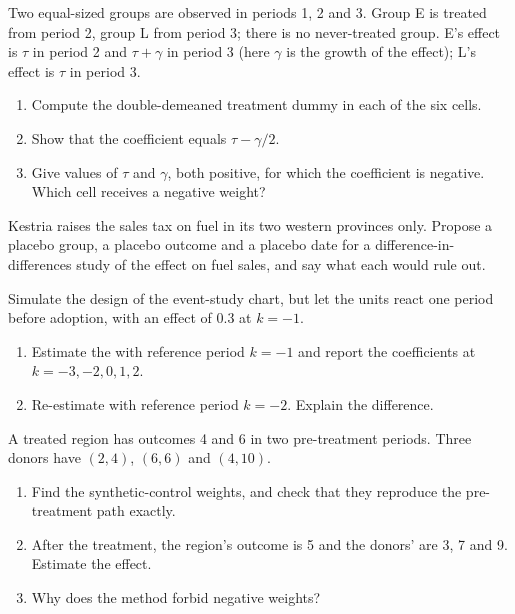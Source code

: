 \begin{exercise}[$\star\star$]\label{exo:b3:difference-in-differences:8}
Two equal-sized groups are observed in periods 1, 2 and 3. Group E is treated
from period 2, group L from period 3; there is no never-treated group. E's
effect is $\tau$ in period 2 and $\tau + \gamma$ in period 3 (here $\gamma$ is
the growth of the effect); L's effect is $\tau$ in period 3.
\begin{enumerate}
\item Compute the double-demeaned treatment dummy in each of the six cells.
\item Show that the  coefficient equals $\tau - \gamma/2$.
\item Give values of $\tau$ and $\gamma$, both positive, for which the
coefficient is negative. Which cell receives a negative weight?
\end{enumerate}
\end{exercise}

\begin{exercise}[$\star\star$]\label{exo:b3:difference-in-differences:9}
Kestria raises the sales tax on fuel in its two western provinces only. Propose
a placebo group, a placebo outcome and a placebo date for a
difference-in-differences study of the effect on fuel sales, and say what
each would rule out.
\end{exercise}

\begin{exercise}[$\star\star\star$]\label{exo:b3:difference-in-differences:10}
Simulate the design of the event-study chart, but let the units react one period
before adoption, with an effect of 0.3 at $k = -1$.
\begin{enumerate}
\item Estimate the  with reference period $k = -1$ and report the
coefficients at $k = -3, -2, 0, 1, 2$.
\item Re-estimate with reference period $k = -2$. Explain the difference.
\end{enumerate}
\end{exercise}

\begin{exercise}[$\star\star\star$]\label{exo:b3:difference-in-differences:11}
A treated region has outcomes 4 and 6 in two pre-treatment periods. Three donors
have $(2, 4)$, $(6, 6)$ and $(4, 10)$.
\begin{enumerate}
\item Find the synthetic-control weights, and check that they reproduce the
pre-treatment path exactly.
\item After the treatment, the region's outcome is 5 and the donors' are 3, 7
and 9. Estimate the effect.
\item Why does the method forbid negative weights?
\end{enumerate}
\end{exercise}

